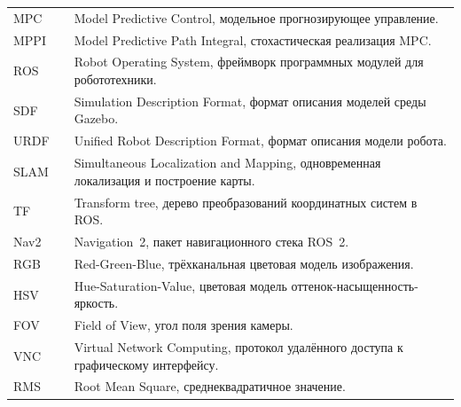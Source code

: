 \noindent
\begin{tabular}{@{}p{}@{}p{}@{}p{}@{}}
MPC          && Model Predictive Control, модельное прогнозирующее управление. \\
MPPI         && Model Predictive Path Integral, стохастическая реализация MPC. \\
ROS          && Robot Operating System, фреймворк программных модулей для робототехники. \\
SDF          && Simulation Description Format, формат описания моделей среды Gazebo. \\
URDF         && Unified Robot Description Format, формат описания модели робота. \\
SLAM         && Simultaneous Localization and Mapping, одновременная локализация и построение карты. \\
TF           && Transform tree, дерево преобразований координатных систем в ROS. \\
Nav2         && Navigation~2, пакет навигационного стека ROS~2. \\
RGB          && Red-Green-Blue, трёхканальная цветовая модель изображения. \\
HSV          && Hue-Saturation-Value, цветовая модель оттенок-насыщенность-яркость. \\
FOV          && Field of View, угол поля зрения камеры. \\
VNC          && Virtual Network Computing, протокол удалённого доступа к графическому интерфейсу. \\
RMS          && Root Mean Square, среднеквадратичное значение. \\
\end{tabular}

